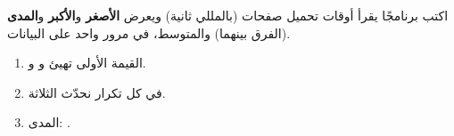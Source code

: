 \begin{statement}
اكتب برنامجًا يقرأ أوقات تحميل  صفحات (بالمللي ثانية) ويعرض \textbf{الأصغر} و\textbf{الأكبر} و\textbf{المدى} (الفرق بينهما) والمتوسط، في مرور واحد على البيانات.
\end{statement}
\begin{stepsbox}\begin{enumerate}
\item القيمة الأولى تهيئ  و و.
\item في كل تكرار نحدّث الثلاثة.
\item المدى: .
\end{enumerate}\end{stepsbox}
